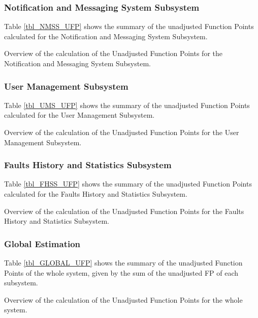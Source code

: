 \subsubsection{Notification and Messaging System Subsystem}
Table \ref{tbl_NMSS_UFP} shows the summary of the unadjusted Function Points calculated for the Notification and Messaging System Subsystem.
\begin{table}[hbtp]
\centering

\caption{Overview of the calculation of the Unadjusted Function Points for the Notification and Messaging System Subsystem.}
\label{tbl_NMSS_UFP}
\end{table}

\subsubsection{User Management Subsystem}
Table \ref{tbl_UMS_UFP} shows the summary of the unadjusted Function Points calculated for the User Management Subsystem.
\begin{table}[hbtp]
\centering

\caption{Overview of the calculation of the Unadjusted Function Points for the User Management Subsystem.}
\label{tbl_UMS_UFP}
\end{table}

\subsubsection{Faults History and Statistics Subsystem}
Table \ref{tbl_FHSS_UFP} shows the summary of the unadjusted Function Points calculated for the Faults History and Statistics Subsystem.
\begin{table}[hbtp]
\centering

\caption{Overview of the calculation of the Unadjusted Function Points for the Faults History and Statistics Subsystem.}
\label{tbl_FHSS_UFP}
\end{table}

\subsubsection{Global Estimation}
Table \ref{tbl_GLOBAL_UFP} shows the summary of the unadjusted Function Points of the whole system, given by the sum of the unadjusted FP of each subsystem.
\begin{table}[hbtp]
\centering

\caption{Overview of the calculation of the Unadjusted Function Points for the whole system.}
\label{tbl_GLOBAL_UFP}
\end{table}

